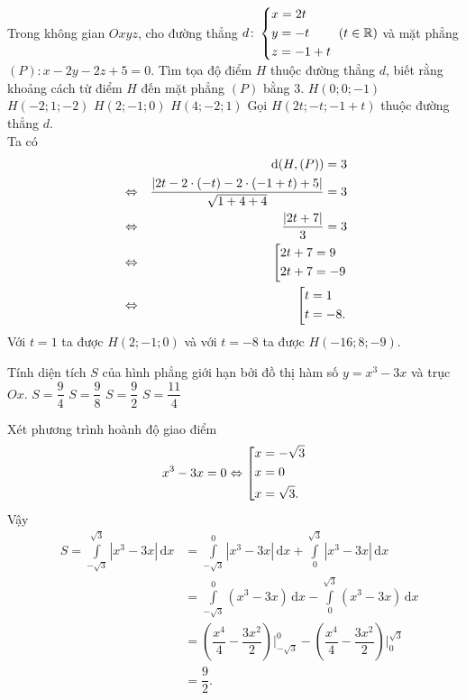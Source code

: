 \begin{ex}%
	Trong không gian $Oxyz$, cho đường thẳng $d\colon\left\{\begin{aligned}&x=2t\\&y=-t\\&z=-1+t\end{aligned}\right.~(t\in\mathbb{R})$ và mặt phẳng $(P)\colon x-2y-2z+5=0$. Tìm tọa độ điểm $H$ thuộc đường thẳng $d$, biết rằng khoảng cách từ điểm $H$ đến mặt phẳng $(P)$ bằng $3$.
	\choice
	{$H(0;0;-1)$}
	{$H(-2;1;-2)$}
	{\True $H(2;-1;0)$}
	{$H(4;-2;1)$}
	\loigiai
	{
		Gọi $H(2t;-t;-1+t)$ thuộc đường thẳng $d$.\\
		Ta có 
		\begin{eqnarray*}
			& &\mathrm{d}(H,(P))=3\\
			& \Leftrightarrow & \dfrac{|2t-2\cdot(-t)-2\cdot(-1+t)+5|}{\sqrt{1+4+4}}=3\\
			& \Leftrightarrow & \dfrac{|2t+7|}{3}=3\\
			& \Leftrightarrow & \left[\begin{aligned}&2t+7=9\\&2t+7=-9\end{aligned}\right.\\
			& \Leftrightarrow & \left[\begin{aligned}&t=1\\&t=-8.\end{aligned}\right.
		\end{eqnarray*}
	Với $t=1$ ta được $H(2;-1;0)$ và với $t=-8$ ta được $H(-16;8;-9)$.
	}
\end{ex}

\begin{ex}%
	Tính diện tích $S$ của hình phẳng giới hạn bởi đồ thị hàm số $y=x^3-3x$ và trục $Ox$.
	\choice
	{$S=\dfrac{9}{4}$}
	{$S=\dfrac{9}{8}$}
	{\True $S=\dfrac{9}{2}$}
	{$S=\dfrac{11}{4}$}
	\loigiai
	{
		Xét phương trình hoành độ giao điểm 
		\[x^3-3x=0\Leftrightarrow\left[\begin{aligned}&x=-\sqrt{3}\\&x=0\\&x=\sqrt{3}.\end{aligned}\right.\]
		Vậy 
		\begin{eqnarray*}
			&S=\displaystyle\int\limits_{-\sqrt{3}}^{\sqrt{3}} |x^3-3x|\mathrm{\,d}x&=\displaystyle\int\limits_{-\sqrt{3}}^0 |x^3-3x|\mathrm{\,d}x+\displaystyle\int\limits_0^{\sqrt{3}} |x^3-3x|\mathrm{\,d}x\\
			& &= \displaystyle\int\limits_{-\sqrt{3}}^0 (x^3-3x)\mathrm{\,d}x-\displaystyle\int\limits_0^{\sqrt{3}} (x^3-3x)\mathrm{\,d}x \\
			& &=\left(\dfrac{x^4}{4}-\dfrac{3x^2}{2}\right)\bigg|_{-\sqrt{3}}^0-\left(\dfrac{x^4}{4}-\dfrac{3x^2}{2}\right)\bigg|_0^{\sqrt{3}}\\
			& &=\dfrac{9}{2}.
		\end{eqnarray*}
	
	}
\end{ex}

